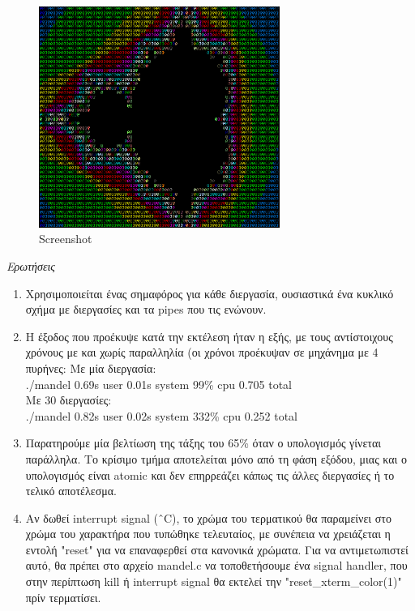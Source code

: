 \documentclass[a4paper,10pt]{article} \usepackage{anysize}
\begin{document}
\begin{figure}[H]
\centering
\includegraphics[width=0.7\textwidth]{files/mandel.png}
\caption{Screenshot}
\end{figure}

\emph{Ερωτήσεις}
\begin{enumerate}
\item Χρησιμοποιείται ένας σημαφόρος για κάθε διεργασία, ουσιαστικά ένα κυκλικό σχήμα με διεργασίες και τα pipes που τις ενώνουν.
\item Η έξοδος που προέκυψε κατά την εκτέλεση ήταν η εξής, με τους αντίστοιχους χρόνους με και χωρίς παραλληλία (οι χρόνοι προέκυψαν σε μηχάνημα με 4 πυρήνες:
Mε μία διεργασία:\\
./mandel  0.69s user 0.01s system 99\% cpu 0.705 total\\
Με 30 διεργασίες:\\
./mandel  0.82s user 0.02s system 332\% cpu 0.252 total
\item Παρατηρούμε μία βελτίωση της τάξης του 65\% όταν ο υπολογισμός γίνεται παράλληλα. Το κρίσιμο τμήμα αποτελείται μόνο από τη φάση εξόδου,
μιας και ο υπολογισμός είναι atomic και δεν επηρρεάζει κάπως τις άλλες διεργασίες ή το τελικό αποτέλεσμα.
\item Αν δωθεί interrupt signal (\^\ C), το χρώμα του τερματικού θα παραμείνει στο χρώμα του χαρακτήρα που τυπώθηκε τελευταίος, με συνέπεια να χρειάζεται
η εντολή "reset" για να επαναφερθεί στα κανονικά χρώματα. Για να αντιμετωπιστεί αυτό, θα πρέπει στο αρχείο mandel.c να τοποθετήσουμε ένα signal handler, που στην περίπτωση kill ή interrupt signal θα εκτελεί την "reset\_xterm\_color(1)" πρίν τερματίσει.
\end{enumerate}
\end{document}

